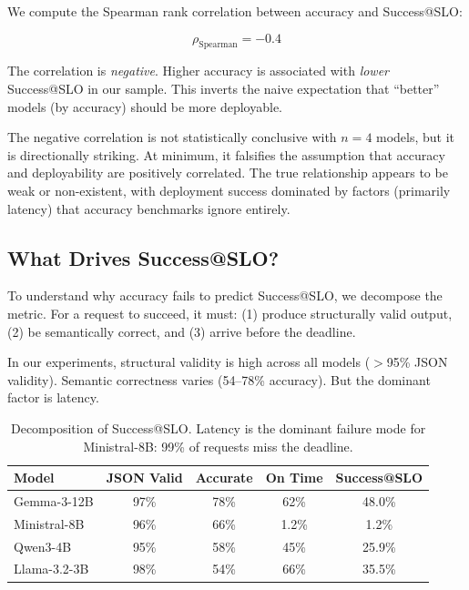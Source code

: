 \documentclass[11pt]{article}
\begin{document}
We compute the Spearman rank correlation between accuracy and Success@SLO:

\begin{equation}
\rho_{\text{Spearman}} = -0.4
\end{equation}

The correlation is \emph{negative}.
Higher accuracy is associated with \emph{lower} Success@SLO in our sample.
This inverts the naive expectation that ``better'' models (by accuracy) should be more deployable.

The negative correlation is not statistically conclusive with $n=4$ models, but it is directionally striking.
At minimum, it falsifies the assumption that accuracy and deployability are positively correlated.
The true relationship appears to be weak or non-existent, with deployment success dominated by factors (primarily latency) that accuracy benchmarks ignore entirely.

\subsection{What Drives Success@SLO?}

To understand why accuracy fails to predict Success@SLO, we decompose the metric.
For a request to succeed, it must:
(1) produce structurally valid output,
(2) be semantically correct, and
(3) arrive before the deadline.

In our experiments, structural validity is high across all models ($>$95\% JSON validity).
Semantic correctness varies (54--78\% accuracy).
But the dominant factor is latency.

\begin{table}[t]
\centering
\caption{Decomposition of Success@SLO. Latency is the dominant failure mode for Ministral-8B: 99\% of requests miss the deadline.}
\label{tab:decomposition}
\begin{tabular}{lcccc}
\toprule
\textbf{Model} & \textbf{JSON Valid} & \textbf{Accurate} & \textbf{On Time} & \textbf{Success@SLO} \\
\midrule
Gemma-3-12B & 97\% & 78\% & 62\% & 48.0\% \\
Ministral-8B & 96\% & 66\% & 1.2\% & 1.2\% \\
Qwen3-4B & 95\% & 58\% & 45\% & 25.9\% \\
Llama-3.2-3B & 98\% & 54\% & 66\% & 35.5\% \\
\bottomrule
\end{tabular}
\end{table}
\end{document}
